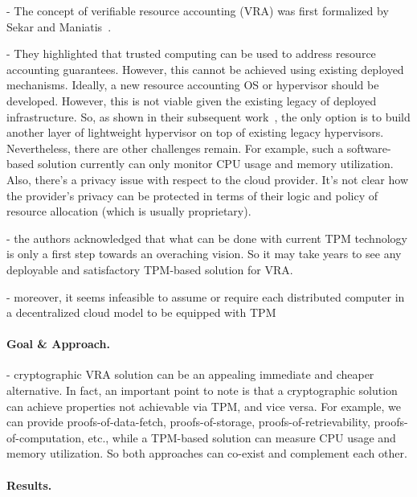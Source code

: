 - The concept of verifiable resource accounting (VRA) was first formalized by Sekar and Maniatis~\cite{SM11}.

- They highlighted that trusted computing can be used to address resource accounting guarantees. However, this cannot be achieved using existing deployed mechanisms. Ideally, a new resource accounting OS or hypervisor should be developed. However, this is not viable given the existing legacy of deployed infrastructure. So, as shown in their subsequent work~\cite{CMP+13}, the only option is to build another layer of lightweight hypervisor on top of existing legacy hypervisors. Nevertheless, there are other challenges remain. For example, such a software-based solution currently can only monitor CPU usage and memory utilization. Also, there's a privacy issue with respect to the cloud provider. It's not clear how the provider's privacy can be protected in terms of their logic and policy of resource allocation (which is usually proprietary).

- the authors acknowledged that what can be done with current TPM technology is only a first step towards an overaching vision. So it may take years to see any deployable and satisfactory TPM-based solution for VRA.

- moreover, it seems infeasible to assume or require each distributed computer in a decentralized cloud model to be equipped with TPM

\paragraph{Goal \& Approach.}
- cryptographic VRA solution can be an appealing immediate and cheaper alternative. In fact, an important point to note is that a cryptographic solution can achieve properties not achievable via TPM, and vice versa. For example, we can provide proofs-of-data-fetch, proofs-of-storage, proofs-of-retrievability, proofs-of-computation, etc., while a TPM-based solution can measure CPU usage and memory utilization. So both approaches can co-exist and complement each other.


\paragraph{Results.}


